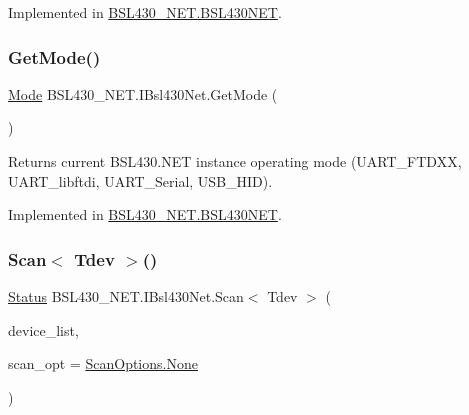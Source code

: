 Implemented in \mbox{\hyperlink{class_b_s_l430___n_e_t_1_1_b_s_l430_n_e_t_ac9bd1e8e4adc0355b5562a24717cfa35}{B\+S\+L430\+\_\+\+N\+E\+T.\+B\+S\+L430\+N\+ET}}.

\mbox{\label{interface_b_s_l430___n_e_t_1_1_i_bsl430_net_abde671fd1ec4d013dd7fe5902f04ee97}} 
\subsubsection{\texorpdfstring{GetMode()}{GetMode()}}
{\footnotesize\ttfamily \mbox{\hyperlink{namespace_b_s_l430___n_e_t_aa1c6981cb6f279b5491d861ca555a1d7}{Mode}} B\+S\+L430\+\_\+\+N\+E\+T.\+I\+Bsl430\+Net.\+Get\+Mode (\begin{DoxyParamCaption}{ }\end{DoxyParamCaption})}



Returns current B\+S\+L430.\+N\+ET instance operating mode (U\+A\+R\+T\+\_\+\+F\+T\+D\+XX, U\+A\+R\+T\+\_\+libftdi, U\+A\+R\+T\+\_\+\+Serial, U\+S\+B\+\_\+\+H\+ID). 



Implemented in \mbox{\hyperlink{class_b_s_l430___n_e_t_1_1_b_s_l430_n_e_t_af98024781d260383a8b869a6338cbeb9}{B\+S\+L430\+\_\+\+N\+E\+T.\+B\+S\+L430\+N\+ET}}.

\mbox{\label{interface_b_s_l430___n_e_t_1_1_i_bsl430_net_ab6f53bec39332434e99912ce3413dbcd}} 
\subsubsection{\texorpdfstring{Scan$<$ Tdev $>$()}{Scan< Tdev >()}}
{\footnotesize\ttfamily \mbox{\hyperlink{class_b_s_l430___n_e_t_1_1_status}{Status}} B\+S\+L430\+\_\+\+N\+E\+T.\+I\+Bsl430\+Net.\+Scan$<$ Tdev $>$ (\begin{DoxyParamCaption}\item[{out List$<$ Tdev $>$}]{device\+\_\+list,  }\item[{\mbox{\hyperlink{namespace_b_s_l430___n_e_t_a4cd6f8166a2a97ccb3405df2287d4ba8}{Scan\+Options}}}]{scan\+\_\+opt = {\ttfamily \mbox{\hyperlink{namespace_b_s_l430___n_e_t_a4cd6f8166a2a97ccb3405df2287d4ba8a6adf97f83acf6453d4a6a4b1070f3754}{Scan\+Options.\+None}}} }\end{DoxyParamCaption})}



